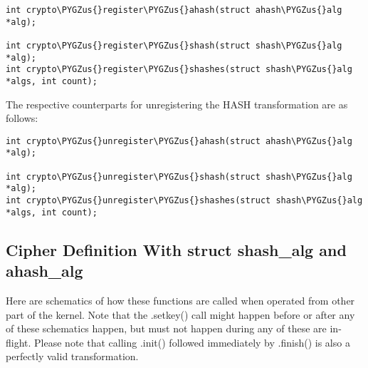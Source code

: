 \documentclass[a4paper,8pt,english]{sphinxmanual}
\def\PYGZus{\char`\_}
\begin{document}
\begin{Verbatim}[commandchars=\\\{\}]
int crypto\PYGZus{}register\PYGZus{}ahash(struct ahash\PYGZus{}alg *alg);

int crypto\PYGZus{}register\PYGZus{}shash(struct shash\PYGZus{}alg *alg);
int crypto\PYGZus{}register\PYGZus{}shashes(struct shash\PYGZus{}alg *algs, int count);
\end{Verbatim}

The respective counterparts for unregistering the HASH transformation
are as follows:

\begin{Verbatim}[commandchars=\\\{\}]
int crypto\PYGZus{}unregister\PYGZus{}ahash(struct ahash\PYGZus{}alg *alg);

int crypto\PYGZus{}unregister\PYGZus{}shash(struct shash\PYGZus{}alg *alg);
int crypto\PYGZus{}unregister\PYGZus{}shashes(struct shash\PYGZus{}alg *algs, int count);
\end{Verbatim}


\subsection{Cipher Definition With struct shash\_alg and ahash\_alg}
\label{crypto/devel-algos:cipher-definition-with-struct-shash-alg-and-ahash-alg}
Here are schematics of how these functions are called when operated from
other part of the kernel. Note that the .setkey() call might happen
before or after any of these schematics happen, but must not happen
during any of these are in-flight. Please note that calling .init()
followed immediately by .finish() is also a perfectly valid
transformation.
\end{document}
